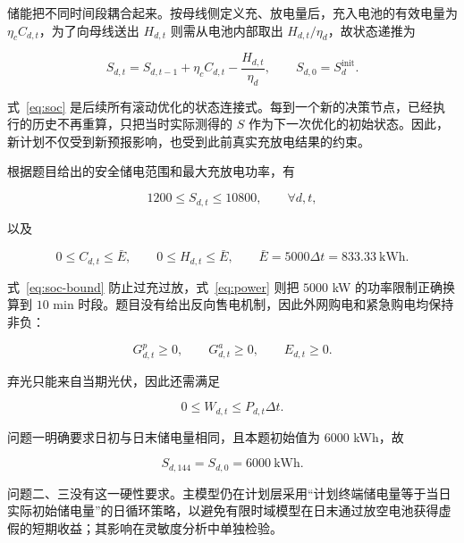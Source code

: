储能把不同时间段耦合起来。按母线侧定义充、放电量后，充入电池的有效电量为 $\eta_c C_{d,t}$，为了向母线送出 $H_{d,t}$ 则需从电池内部取出 $H_{d,t}/\eta_d$，故状态递推为

\begin{equation}
    S_{d,t}=S_{d,t-1}+\eta_c C_{d,t}-\frac{H_{d,t}}{\eta_d},
    \qquad S_{d,0}=S^{\mathrm{init}}_d .
    \label{eq:soc}
\end{equation}

式~\eqref{eq:soc} 是后续所有滚动优化的状态连接式。每到一个新的决策节点，已经执行的历史不再重算，只把当时实际测得的 $S$ 作为下一次优化的初始状态。因此，新计划不仅受到新预报影响，也受到此前真实充放电结果的约束。

根据题目给出的安全储电范围和最大充放电功率，有

\begin{equation}
    1200\le S_{d,t}\le10800,
    \qquad \forall d,t ,
    \label{eq:soc-bound}
\end{equation}

以及

\begin{equation}
    0\le C_{d,t}\le\bar E,\qquad
    0\le H_{d,t}\le\bar E,
    \qquad \bar E=5000\Delta t=833.33\ \text{kWh}.
    \label{eq:power}
\end{equation}

式~\eqref{eq:soc-bound} 防止过充过放，式~\eqref{eq:power} 则把 $5000$ kW 的功率限制正确换算到 $10$ min 时段。题目没有给出反向售电机制，因此外网购电和紧急购电均保持非负：

\begin{equation}
    G^{p}_{d,t}\ge0,\qquad G^{a}_{d,t}\ge0,\qquad E_{d,t}\ge0 .
    \label{eq:nonneg}
\end{equation}

弃光只能来自当期光伏，因此还需满足

\begin{equation}
    0\le W_{d,t}\le P_{d,t}\Delta t .
    \label{eq:curtail}
\end{equation}

问题一明确要求日初与日末储电量相同，且本题初始值为 $6000$ kWh，故

\begin{equation}
    S_{d,144}=S_{d,0}=6000\ \text{kWh}.
    \label{eq:terminal-q1}
\end{equation}

问题二、三没有这一硬性要求。主模型仍在计划层采用“计划终端储电量等于当日实际初始储电量”的日循环策略，以避免有限时域模型在日末通过放空电池获得虚假的短期收益；其影响在灵敏度分析中单独检验。

